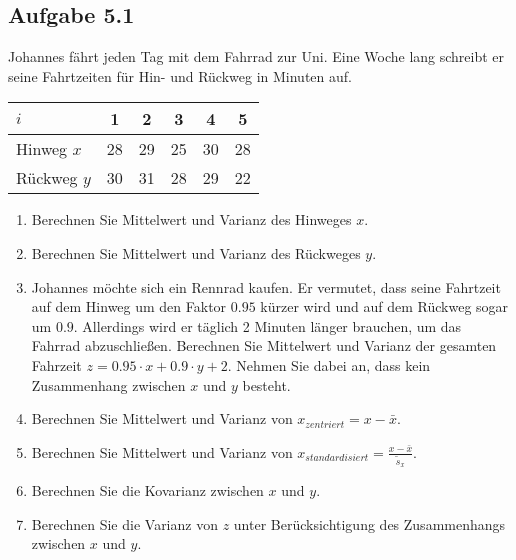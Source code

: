 \documentclass{article}
\begin{document}
	\subsection*{Aufgabe 5.1}
	Johannes fährt jeden Tag mit dem Fahrrad zur Uni. Eine Woche lang schreibt er seine Fahrtzeiten für Hin- und Rückweg in Minuten auf.
	\begin{center}
		\begin{tabular}{l|ccccc}
			\hline
			$i$ & 1 & 2 & 3 & 4 & 5\\
			\hline
			Hinweg $x$ & 28 & 29 & 25 & 30 & 28 \\
			Rückweg $y$ & 30 & 31 & 28 & 29 & 22\\
			\hline
		\end{tabular}
	\end{center}
	\begin{enumerate}[label=(\alph*)]
		\item Berechnen Sie Mittelwert und Varianz des Hinweges $x$.
		\item Berechnen Sie Mittelwert und Varianz des Rückweges $y$.
		\item Johannes möchte sich ein Rennrad kaufen. Er vermutet, dass seine Fahrtzeit auf dem Hinweg um den Faktor $0.95$ kürzer wird und auf dem Rückweg sogar um $0.9$. Allerdings wird er täglich 2 Minuten länger brauchen, um das Fahrrad abzuschließen. Berechnen Sie Mittelwert und Varianz der gesamten Fahrzeit $z=0.95\cdot x+0.9\cdot y +2$. Nehmen Sie dabei an, dass kein Zusammenhang zwischen $x$ und $y$ besteht.
		\item Berechnen Sie Mittelwert und Varianz von $x_{zentriert}=x-\bar{x}$.
		\item Berechnen Sie Mittelwert und Varianz von $x_{standardisiert}=\frac{x-\bar{x}}{\tilde{s}_x}$.
		\item Berechnen Sie die Kovarianz zwischen $x$ und $y$.
		\item Berechnen Sie die Varianz von $z$ unter Berücksichtigung des Zusammenhangs zwischen $x$ und $y$.
	\end{enumerate}
\end{document}
